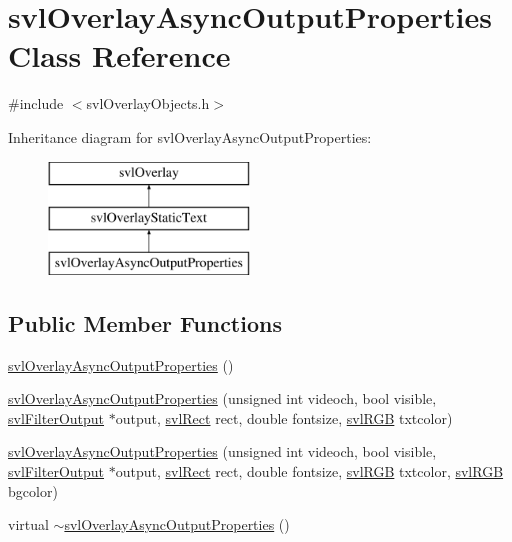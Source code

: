 \hypertarget{classsvl_overlay_async_output_properties}{\section{svl\-Overlay\-Async\-Output\-Properties Class Reference}
\label{classsvl_overlay_async_output_properties}
}


{\ttfamily \#include $<$svl\-Overlay\-Objects.\-h$>$}

Inheritance diagram for svl\-Overlay\-Async\-Output\-Properties\-:\begin{figure}[H]
\begin{center}
\leavevmode
\includegraphics[height=3.000000cm]{dd/dcf/classsvl_overlay_async_output_properties}
\end{center}
\end{figure}
\subsection*{Public Member Functions}
\begin{DoxyCompactItemize}
\item 
\hyperlink{classsvl_overlay_async_output_properties_a6802d3228526e7b173a8656ce5dacdc2}{svl\-Overlay\-Async\-Output\-Properties} ()
\item 
\hyperlink{classsvl_overlay_async_output_properties_ad6c842692f236608be60322d44cac8b1}{svl\-Overlay\-Async\-Output\-Properties} (unsigned int videoch, bool visible, \hyperlink{classsvl_filter_output}{svl\-Filter\-Output} $\ast$output, \hyperlink{structsvl_rect}{svl\-Rect} rect, double fontsize, \hyperlink{structsvl_r_g_b}{svl\-R\-G\-B} txtcolor)
\item 
\hyperlink{classsvl_overlay_async_output_properties_a6d215c0e5b5c0a78de38e466172a84aa}{svl\-Overlay\-Async\-Output\-Properties} (unsigned int videoch, bool visible, \hyperlink{classsvl_filter_output}{svl\-Filter\-Output} $\ast$output, \hyperlink{structsvl_rect}{svl\-Rect} rect, double fontsize, \hyperlink{structsvl_r_g_b}{svl\-R\-G\-B} txtcolor, \hyperlink{structsvl_r_g_b}{svl\-R\-G\-B} bgcolor)
\item 
virtual \hyperlink{classsvl_overlay_async_output_properties_a5fb9af890770371c121996d69b178a30}{$\sim$svl\-Overlay\-Async\-Output\-Properties} ()
\end{DoxyCompactItemize}
